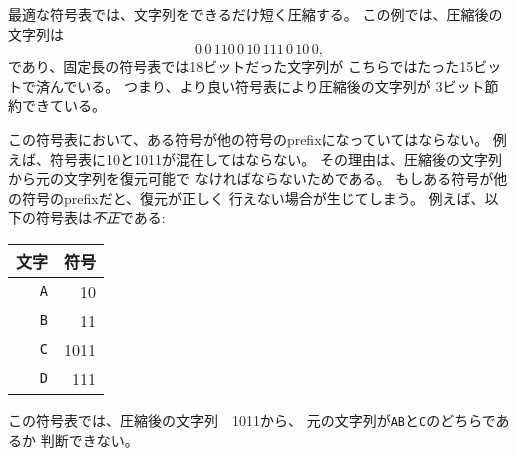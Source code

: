 最適な符号表では、文字列をできるだけ短く圧縮する。
この例では、圧縮後の文字列は
\[0\,0\,110\,0\,10\,111\,0\,10\,0,\]
であり、固定長の符号表では18ビットだった文字列が
こちらではたった15ビットで済んでいる。
つまり、より良い符号表により圧縮後の文字列が
3ビット節約できている。

\begin{comment}
We require that no codeword
is a prefix of another codeword.
For example, it is not allowed that a code
would contain both codewords 10
and 1011.
The reason for this is that we want
to be able to generate the original string
from the compressed string.
If a codeword could be a prefix of another codeword,
this would not always be possible.
For example, the following code is \emph{not} valid:
\begin{center}
\begin{tabular}{rr}
character & codeword \\
\hline
\texttt{A} & 10 \\
\texttt{B} & 11 \\
\texttt{C} & 1011 \\
\texttt{D} & 111 \\
\end{tabular}
\end{center}
Using this code, it would not be possible to know
if the compressed string 1011 corresponds to
the string \texttt{AB} or the string \texttt{C}.
\end{comment}

この符号表において、ある符号が他の符号のprefixになっていてはならない。
例えば、符号表に10と1011が混在してはならない。
その理由は、圧縮後の文字列から元の文字列を復元可能で
なければならないためである。
もしある符号が他の符号のprefixだと、復元が正しく
行えない場合が生じてしまう。
例えば、以下の符号表は\emph{不正}である:
\begin{center}
\begin{tabular}{rr}
文字 & 符号 \\
\hline
\texttt{A} & 10 \\
\texttt{B} & 11 \\
\texttt{C} & 1011 \\
\texttt{D} & 111 \\
\end{tabular}
\end{center}
この符号表では、圧縮後の文字列　1011から、
元の文字列が\texttt{AB}と\texttt{C}のどちらであるか
判断できない。

